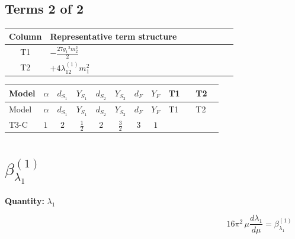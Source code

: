 \documentclass[8pt]{article}
\begin{document}
\begin{landscape}
\subsection*{Terms 2 of 2}
\begin{center}
\begin{tabular}{@{}c >{\raggedright\arraybackslash}p{0.82\linewidth}@{}}
\toprule
Column & Representative term structure \\
\midrule
T1 & \(\displaystyle -\frac{27 {g_1}^2 {m_2^2}}{2}\) \\
\midrule
T2 & \(\displaystyle +4 {\lambda_{12}^{(1)}} {m_1^2}\) \\
\midrule
\bottomrule
\end{tabular}
\end{center}
\smallskip
\tiny
\begin{longtable}{@{}llcccccc >{\raggedright\arraybackslash}p{0.21\linewidth} >{\raggedright\arraybackslash}p{0.21\linewidth}@{}}
\toprule
Model & $\alpha$ & $d_{S_1}$ & $Y_{S_1}$ & $d_{S_2}$ & $Y_{S_2}$ & $d_F$ & $Y_F$ & T1 & T2 \\
\midrule
\endfirsthead
\toprule
Model & $\alpha$ & $d_{S_1}$ & $Y_{S_1}$ & $d_{S_2}$ & $Y_{S_2}$ & $d_F$ & $Y_F$ & T1 & T2 \\
\midrule
\endhead
T3-C & $1$ & $2$ & $\frac{1}{2}$ & $2$ & $\frac{3}{2}$ & $3$ & $1$ & \scriptsize\adjustbox{max width=\linewidth}{$\begin{gathered} -\frac{27 {g_1}^2 {m_2^2}}{2}\end{gathered}$} & \scriptsize\adjustbox{max width=\linewidth}{$\begin{gathered} +4 {\lambda_{12}^{(1)}} {m_1^2}\end{gathered}$} \\
\midrule
\bottomrule
\end{longtable}
\clearpage
\section*{$\beta_{\lambda_1}^{(1)}$}
\noindent\textbf{Quantity: }$\lambda_1$\par\smallskip
\[16\pi^2\,\mu\frac{d \lambda_1}{d\mu}=\beta_{\lambda_1}^{(1)}\]

\end{landscape}
\end{document}

